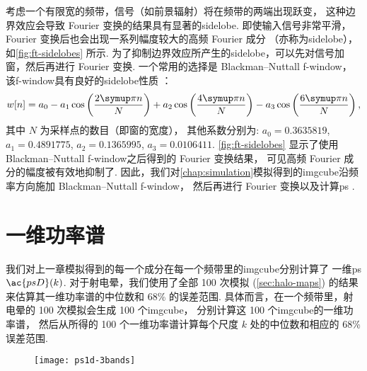 考虑一个有限宽的频带，信号（如前景辐射）将在频带的两端出现跃变，
这种边界效应会导致 Fourier 变换的结果具有显著的\ac{sidelobe}.
即使输入信号非常平滑，Fourier 变换后也会出现一系列幅度较大的高频 Fourier 成分
（亦称为\ac{sidelobe}），如\autoref{fig:ft-sidelobes} 所示.
为了抑制边界效应所产生的\ac{sidelobe}，可以先对信号加窗，然后再进行 Fourier 变换.
一个常用的选择是 Blackman--Nuttall \ac{f-window}，
该\ac{f-window}具有良好的\ac{sidelobe}性质 \cite{nuttall1981}：
\begin{equation}
  \label{eq:bn-window}
  w[n] = a_0 - a_1 \cos\left(\frac{2\Cpi n}{N}\right)
    + a_2 \cos\left(\frac{4\Cpi n}{N}\right)
    - a_3 \cos\left(\frac{6\Cpi n}{N}\right) ,
\end{equation}
其中
$N$ 为采样点的数目（即窗的宽度），
其他系数分别为:
$a_0 = \num{0.3635819}$,
$a_1 = \num{0.4891775}$,
$a_2 = \num{0.1365995}$,
$a_3 = \num{0.0106411}$.
\autoref{fig:ft-sidelobes} 显示了使用 Blackman--Nuttall
\ac{f-window}之后得到的 Fourier 变换结果，
可见高频 Fourier 成分的幅度被有效地抑制了.
因此，我们对\autoref{chap:simulation}模拟得到的\ac{imgcube}沿频率方向施加
Blackman--Nuttall \ac{f-window}，
然后再进行 Fourier 变换以及计算\ac{ps} \cite{trott2015,chapman2016}.


\section{一维功率谱}
\label{sec:ps1d}

我们对上一章模拟得到的每一个成分在每一个频带里的\ac{imgcube}分别计算了
一维\ac{ps} $\ac{psD}(k)$.
对于射电晕，我们使用了全部 100 次模拟 (\autoref{sec:halo-maps}) 的结果
来估算其一维功率谱的中位数和 68\% 的误差范围.
具体而言，在一个频带里，射电晕的 100 次模拟会生成 100 个\ac{imgcube}，
分别计算这 100 个\ac{imgcube}的一维功率谱，
然后从所得的 100 个一维功率谱计算每个尺度 $k$ 处的中位数和相应的 68\% 误差范围.

\begin{figure}[htp]
  \centering
  \texttt{[image: ps1d-3bands]}
  \label{fig:ps1d-3bands}
\end{figure}

